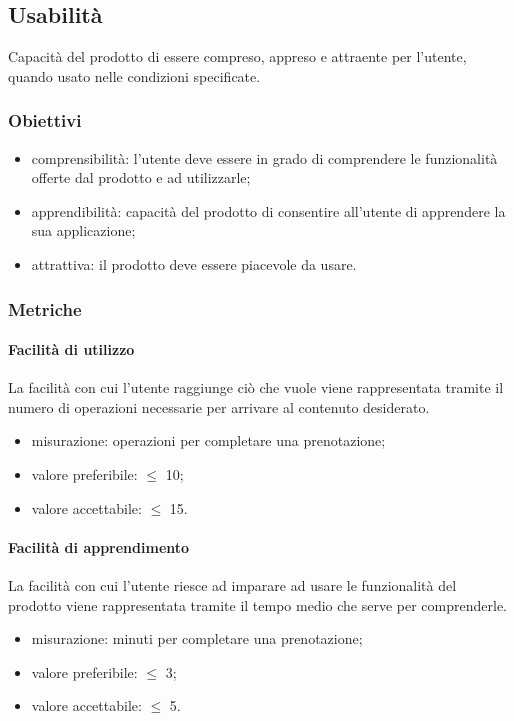 	\subsection{Usabilità}
	Capacità del prodotto di essere compreso, appreso e attraente per l'utente, quando usato nelle condizioni specificate.
		\subsubsection{Obiettivi}
		\begin{itemize}
			\item comprensibilità: l'utente deve essere in grado di comprendere le funzionalità offerte dal prodotto e ad utilizzarle;
			\item apprendibilità: capacità del prodotto di consentire all'utente di apprendere la sua applicazione;
			\item attrattiva: il prodotto deve essere piacevole da usare.
		\end{itemize}
		\subsubsection{Metriche}
			\paragraph{Facilità di utilizzo}
			La facilità con cui l'utente raggiunge ciò che vuole viene rappresentata tramite il numero di operazioni necessarie per arrivare al contenuto desiderato.
			\begin{itemize}
			\item misurazione: operazioni per completare una prenotazione;
			\item valore preferibile: $\leq$ 10;
			\item valore accettabile: $\leq$ 15.
			\end{itemize}
			\paragraph{Facilità di apprendimento}
			La facilità con cui l'utente riesce ad imparare ad usare le funzionalità del prodotto viene rappresentata tramite il tempo medio che serve per comprenderle.
			\begin{itemize}
			\item misurazione: minuti per completare una prenotazione;
			\item valore preferibile: $\leq$ 3;
			\item valore accettabile: $\leq$ 5.
			\end{itemize}
